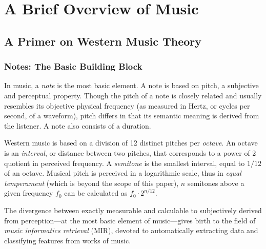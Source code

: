 \chapter{A Brief Overview of Music}

\section{A Primer on Western Music Theory}

\subsection{Notes: The Basic Building Block}

In music, a \textit{note} is the most basic element. A note is based on pitch, a subjective and perceptual property. Though the pitch of a note is closely related and usually resembles its objective physical frequency (as measured in Hertz, or cycles per second, of a waveform), pitch differs in that its semantic meaning is derived from the listener. A note also consists of a duration.

Western music is based on a division of 12 distinct pitches per \textit{octave}. An octave is an \textit{interval}, or distance between two pitches, that corresponds to a power of 2 quotient in perceived frequency. A \textit{semitone} is the smallest interval, equal to $1/12$ of an octave. Musical pitch is perceived in a logarithmic scale, thus in \textit{equal temperament} (which is beyond the scope of this paper), $n$ semitones above a given frequency $f_0$ can be calculated as $f_0 \cdot 2^{n/12}$.

The divergence between exactly measurable and calculable to subjectively derived from perception---at the most basic element of music---gives birth to the field of \textit{music informatics retrieval} (MIR), devoted to automatically extracting data and classifying features from works of music.